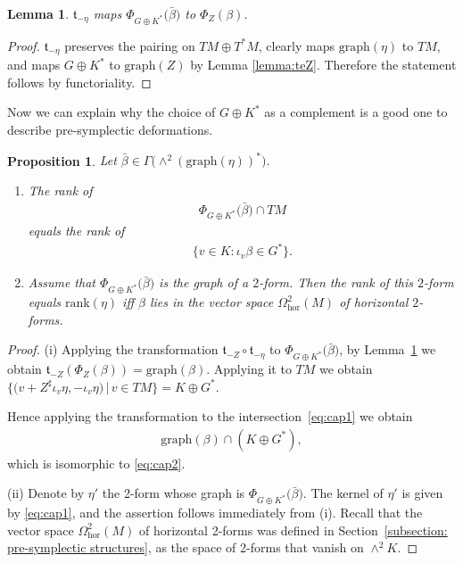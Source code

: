 \documentclass[10pt,a4paper]{amsart}
\numberwithin{equation}{section}
\newtheorem{Lemma}[Theorem]{Lemma}
\newtheorem{Proposition}[Theorem]{Proposition}
 { \theoremstyle{definition}
\newtheorem{Definition}[Theorem]{Definition}
\newtheorem{Remark}[Theorem]{Remark} }
\newcommand{\hor}{\mathrm{hor}}
\renewcommand{\t}{\mathfrak{t}}
\begin{document}
\begin{Lemma}\label{lemma:tme} $\t_{-\eta}$ maps $\Phi_{G\oplus K^*}\big(\bar{\beta}\big)$ to $\Phi_{Z}({\beta})$.
\end{Lemma}
\begin{proof}$\t_{-\eta}$ preserves the pairing on $TM\oplus T^*M$, clearly maps $\mathrm{graph}(\eta)$ to $TM$, and maps $G\oplus K^*$ to $\mathrm{graph}(Z)$ by Lemma \ref{lemma:teZ}. Therefore the statement follows by functoriality.
\end{proof}

Now we can explain why the choice of $G\oplus K^*$ as a complement is a good one to describe pre-symplectic deformations.

\begin{Proposition}\label{prop:rankgood} Let $\bar{\beta}\in \Gamma\big({\wedge}^2(\mathrm{graph}(\eta))^*\big)$.
\begin{enumerate}\itemsep=0pt
\item[$(i)$] The rank of
\begin{gather}\label{eq:cap1}
\Phi_{G\oplus K^*}\big(\bar{\beta}\big)\cap TM
\end{gather}
 equals the rank of
 \begin{gather}\label{eq:cap2}
\{v\in K\colon \iota_v\beta \in G^*\}.
\end{gather}
\item[$(ii)$] Assume that $\Phi_{G\oplus K^*}\big(\bar{\beta}\big)$ is the graph of a $2$-form. Then the rank of this $2$-form equals $\mathrm{rank}({\eta})$ if{f} $\beta$ lies in the vector space $\Omega^2_\hor(M)$ of horizontal $2$-forms.
\end{enumerate}
\end{Proposition}

\begin{proof} (i) Applying the transformation $\t_{-Z}\circ \t_{-\eta}$ to $\Phi_{G\oplus K^*}\big(\bar{\beta}\big)$, by Lemma~\ref{lemma:tme} we obtain $\t_{-Z}(\Phi_{Z}({\beta}))=\mathrm{graph}(\beta)$. Applying it to $TM$ we obtain $\big\{\big(v+Z^\sharp\iota_v\eta, -\iota_v\eta\big)\,|\,v\in {TM} \big\}=K\oplus G^*$.

Hence applying the transformation to the intersection~\eqref{eq:cap1} we obtain
\begin{gather*}\mathrm{graph}(\beta)\cap (K\oplus G^*),\end{gather*} which is isomorphic to \eqref{eq:cap2}.

(ii) Denote by $\eta'$ the 2-form whose graph is $\Phi_{G\oplus K^*}\big(\bar{\beta}\big)$. The kernel of $\eta'$ is given by \eqref{eq:cap1}, and the assertion follows immediately from (i). Recall that the vector space $\Omega^2_{\hor}(M)$ of horizontal 2-forms was defined in Section~\ref{subsection: pre-symplectic structures}, {as the space of 2-forms that vanish on $\wedge^2 K$.}
\end{proof}
\end{document}
